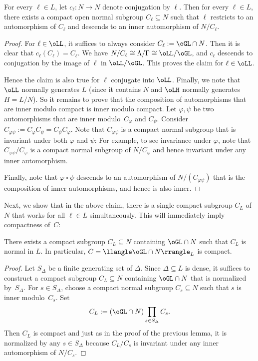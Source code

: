 \begin{lemma}\label{lemma:innermodcmpt}
For every $\ell\in L$, let $c_\ell:N\to N$ denote conjugation by $\ell$. Then for every $\ell\in L$, there exists a compact open normal subgroup $C_\ell\subseteq N$ such that $\ell$ restricts to an automorphism of $C_\ell$ and descends to an inner automorphism of $N/C_\ell$.
\end{lemma}
\begin{proof} For $\ell\in\oLL$, it suffices to always consider $C_\ell:=\oGL\cap N$. Then it is clear that $c_\ell(C_\ell)=C_\ell$. We have $N/C_\ell \cong \Lambda/\Gamma\cong \oLL/\oGL$, and $c_\ell$ descends to conjugation by the image of $\ell$ in $\oLL/\oGL$. This proves the claim for $\ell\in\oLL$.

Hence the claim is also true for $\ell$ conjugate into $\oLL$. Finally, we note that $\oLL$ normally generates $L$ (since it contains $N$ and $\oLH$ normally generates $H=L/N$). So it remains to prove that the composition of automorphisms that are inner modulo compact is inner modulo compact. Let $\varphi,\psi$ be two automorphisms that are inner modulo~$C_\varphi$ and $C_\psi$. Consider $C_{\varphi\psi}:=C_\varphi C_\psi = C_\psi C_\varphi$. Note that $C_{\varphi\psi}$ is a compact normal subgroup that is invariant under both $\varphi$ and $\psi$: For example, to see invariance under $\varphi$, note that $C_{\varphi\psi}/ C_\varphi$ is a compact normal subgroup of $N/C_\varphi$ and hence invariant under any inner automorphism.

Finally, note that $\varphi\circ \psi$ descends to an automorphism of $N/(C_{\varphi\psi})$ that is the composition of inner automorphisms, and hence is also inner.\end{proof}

Next, we show that in the above claim, there is a single compact subgroup $C_L$ of~$N$ that works for all $\ell\in L$ simultaneously. This will immediately imply compactness of~$C$:

\begin{lemma}\label{lemma:c-cmpt}
There exists a compact subgroup $C_L\subseteq N$ containing $\oGL\cap N$ such that $C_L$ is normal in $L$. In particular, $C=\llangle \oGL\cap N\rrangle_L$ is compact.
\end{lemma}
\begin{proof} Let $S_\Delta$ be a finite generating set of $\Delta$. Since $\Delta\subseteq L$ is dense, it suffices to construct a compact subgroup $C_L\subseteq N$ containing $\oGL\cap N$ that is normalized by~$S_\Delta$. For $s\in S_\Delta$, choose a compact normal subgroup $C_s\subseteq N$ such that $s$ is inner modulo~$C_s$. Set
\[
C_L:=(\oGL\cap N)\prod_{s\in S_\Delta} C_s.
\]
Then $C_L$ is compact and just as in the proof of the previous lemma, it is normalized by any $s\in S_\Delta$ because $C_L/C_s$ is invariant under any inner automorphism of $N/C_s$.\end{proof}

